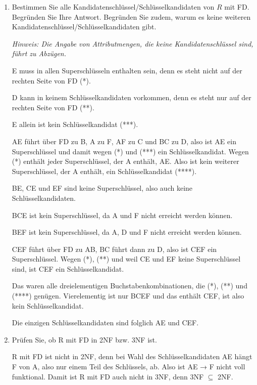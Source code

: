 \documentclass{bschlangaul-aufgabe}
\begin{document}
\begin{enumerate}


\item Bestimmen Sie alle Kandidatenschlüssel/Schlüsselkandidaten von $R$
mit FD. Begründen Sie Ihre Antwort. Begründen Sie zudem, warum es keine
weiteren Kandidatenschlüssel/Schlüsselkandidaten gibt.

\emph{Hinweis: Die Angabe von Attributmengen, die keine
Kandidatenschlüssel sind, führt zu Abzügen.}

\begin{bAntwort}
E muss in allen Superschlüsseln enthalten sein, denn es steht nicht auf
der rechten Seite von FD (*).

D kann in keinem Schlüsselkandidaten vorkommen, denn es steht nur auf
der rechten Seite von FD (**).

E allein ist kein Schlüsselkandidat (***).

AE führt über FD zu B, A zu F, AF zu C und BC zu D, also ist AE ein
Superschlüssel und damit wegen (*) und (***) ein Schlüsselkandidat.
Wegen (*) enthält jeder Superschlüssel, der A enthält, AE. Also ist kein
weiterer Superschlüssel, der A enthält, ein Schlüsselkandidat (****).

BE, CE und EF sind keine Superschlüssel, also auch keine
Schlüsselkandidaten.

BCE ist kein Superschlüssel, da A und F nicht erreicht werden können.

BEF ist kein Superschlüssel, da A, D und F nicht erreicht werden können.

CEF führt über FD zu AB, BC führt dann zu D, also ist CEF ein
Superschlüssel. Wegen (*), (**) und weil CE und EF keine Superschlüssel
sind, ist CEF ein Schlüsselkandidat.

Das waren alle dreielementigen Buchstabenkombinationen, die (*), (**)
und (****) genügen. Vierelementig ist nur BCEF und das enthält CEF, ist
also kein Schlüsselkandidat.

Die einzigen Schlüsselkandidaten sind folglich AE und CEF.
\end{bAntwort}


\item Prüfen Sie, ob R mit FD in 2NF bzw. 3NF ist.

\begin{bAntwort}
R mit FD ist nicht in 2NF, denn bei Wahl des Schlüsselkandidaten AE
hängt F von A, also nur einem Teil des Schlüssels, ab. Also ist AE → F
nicht voll funktional. Damit ist R mit FD auch nicht in 3NF, denn 3NF
$\subseteq$ 2NF.
\end{bAntwort}


\end{enumerate}
\end{document}
